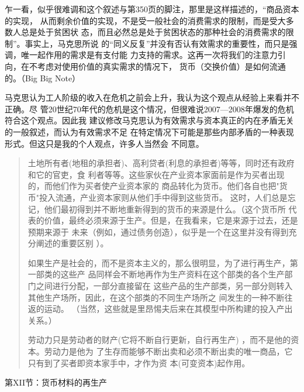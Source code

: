 乍一看，似乎很难调和这个叙述与第350页的脚注，那里是这样描述的，“商品资本的实现，
从而剩余价值的实现，不是受一般社会的消费需求的限制，而是受大多数人总是处于贫困状
态，而且必然总是处于贫困状态的那种社会的消费需求的限制”。事实上，马克思所说
的“同义反复”并没有否认有效需求的重要性，而只是强调，唯一起作用的需求是有支付能
力支持的需求。这再一次将我们的注意力引向，在不考虑对使用价值的真实需求的情况下，
货币（交换价值）是如何流通的。（Big Big Note）

马克思认为工人阶级的收入在危机之前会上升，我认为这个观点从经验上来看并不正确。尽
管20世纪70年代的危机是这个情况，但很难说2007—2008年爆发的危机符合这个观点。因此我
建议修改马克思认为有效需求与资本真正的内在矛盾无关的一般叙述，而认为有效需求不足
在特定情况下可能是那些内部矛盾的一种表现形式。但这只是我的个人观点，许多人当然会
不同意。

\begin{quotation}
  土地所有者(地租的承担者)、高利贷者(利息的承担者)等等，同时还有政府和它的官吏，食
  利者等等。这些家伙在产业资本家面前是作为买者出现的，而他们作为买者使产业资本家的
  商品转化为货币。他们各自也把"货币"投入流通，产业资本家则从他们手中得到这些货币。
  这时，人们总是忘记，他们最初得到并不断地重新得到的货币的来源是什么。（这个货币所
  代表的价值，最终必须来源于生产。但是，在我看来，它是来源于过去，还是预期来源于
  未来（例如，通过债务创造），似乎是一个在这里并没有得到充分阐述的重要区别
  ）。

如果生产是社会的，而不是资本主义的，那么很明显，为了进行再生产，第一部类的这些产
品同样会不断地再作为生产资料在这个部类的各个生产部门之间进行分配，一部分直接留在
这些产品的生产部类，另一部分则转入其他生产场所，因此，在这个部类的不同生产场所之
间发生的一种不断往返的运动。 （当然，这些就是里昂惕夫后来在其模型中所构建的投入产出关系。）

劳动力只是劳动者的财产(它将不断自行更新，自行再生产) ，而不是他的资本。劳动力是他为
了生存而能够不断出卖和必须不断出卖的唯一商品，它只有到了买者即资本家手中，才作为资
本(可变资本)起作用。 
\end{quotation}

第XII节：货币材料的再生产

